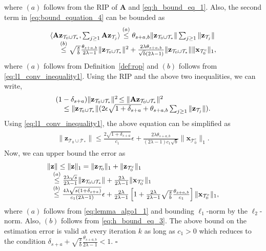 \documentclass[journal]{IEEEtran}
\newcommand{\mbx}{\mathbf{x}}
\newcommand{\mbA}{\mathbf{A}}
\newcommand{\mbz}{\mathbf{z}}
\newcommand{\T}{\mathcal{T}}
\newcommand*{\QEDB}{\hfill\ensuremath{\square}}%
\begin{document}
where $(a)$ follows from the RIP of $\mbA$ and \eqref{eq:h_bound_eq_1}. Also, the second term in \eqref{eq:bound_equation_4} can be bounded as
\begin{eqnarray*}
\begin{array}{l}
\langle \mbA\mbz_{\T_0 \cup \T_*},\sum_{j \geq 1}\mbA \mbz_{\T_j}\rangle 
\stackrel{(a)}{\leq} \theta_{s+a,b} \|\mbz_{\T_0 \cup \T_*}\| \sum_{j\geq 1} \|\mbz_{\T_j}\| \\
\hspace{5mm} \stackrel{(b)}{\leq} \sqrt{\frac{s}{b}}\frac{\theta_{s+a,b}}{2\lambda -1}\|\mbz_{\T_0 \cup \T_*}\|^2 + \frac{2\lambda \theta_{s+a,b}}{\sqrt{b}(2\lambda -1)}\|\mbz_{\T_0 \cup \T_*}\| \|\mbx_{\T_0^c}\|_1,
\end{array}
\end{eqnarray*}
where $(a)$ follows from Definition~\ref{def:rop} and $(b)$ follows from \eqref{eq:l1_conv_inequality1}. Using the RIP and the above two inequalities, we can write,
\begin{eqnarray}
\label{eq:l1_conv_inequality2}
\begin{array}{rl}
(1-\delta_{s+a})\|\mbz_{\T_0 \cup \T_*}\|^2 & \hspace{-3mm} \leq \|\mbA\mbz_{\T_0 \cup \T_*}\|^2 \\ & \hspace{-30mm} \leq \|\mbz_{\T_0 \cup \T_*}\| (2\epsilon \sqrt{1+\delta_{s+a}} + \theta_{s+a,b} \sum_{j\geq 1} \|\mbz_{\T_j}\| ).
\end{array}
\end{eqnarray}
Using \eqref{eq:l1_conv_inequality1}, the above equation can be simplified as
\begin{eqnarray}
\label{eq:h_bound_eq_3}
\begin{array}{l}
\|\mbz_{\T_0 \cup \T_*}\| \leq \frac{2\sqrt{1+\delta_{s+a}}}{c_1} \epsilon + \frac{2 \lambda \theta_{s+a,b}}{(2\lambda-1)c_1 \sqrt{b}} \|\mbx_{\T_0^c}\|_1.
\end{array}
\end{eqnarray}
Now, we can upper bound the error as
\begin{eqnarray*}
\begin{array}{l}
\|\mbz\| \leq \|\mbz\|_1 = \|\mbz_{\T_0}\|_1 + \|\mbz_{\T_0^c}\|_1 \\
\hspace{3mm} \stackrel{(a)}{\leq} \frac{2\lambda \sqrt{s}}{2\lambda-1}\|\mbz_{\T_0 \cup \T_*}\| + \frac{2\lambda}{2\lambda-1}\|\mbx_{\T_0^c}\|_1 \\
\hspace{3mm} \stackrel{(b)}{\leq} \frac{4 \lambda \sqrt{s(1+\delta_{s+a})}}{c_1(2\lambda -1)} \epsilon + \frac{2\lambda}{2\lambda -1}\left[1 + \frac{2\lambda}{2\lambda -1} \sqrt{\frac{s}{b}} \frac{\theta_{s+a,b}}{c_1}\right]\|\mbx_{\T_0^c}\|_1,
\end{array}
\end{eqnarray*}
where $(a)$ follows from \eqref{eq:lemma_algo1_1} and bounding $\ell_1$-norm by the $\ell_2$-norm. Also, $(b)$ follows from \eqref{eq:h_bound_eq_3}. The above bound on the estimation error is valid at every iteration $k$ as long as $c_1 > 0$ which reduces to the condition $\delta_{s+a}+\sqrt{\frac{s}{b}}\frac{\theta_{s+a,b}}{2\lambda -1} < 1$.
\QEDB
\end{document}

